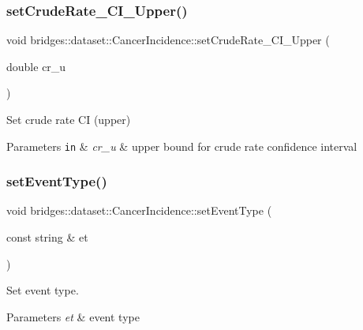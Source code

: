 \subsubsection{\texorpdfstring{set\+Crude\+Rate\+\_\+\+C\+I\+\_\+\+Upper()}{setCrudeRate\_CI\_Upper()}}
{\footnotesize\ttfamily void bridges\+::dataset\+::\+Cancer\+Incidence\+::set\+Crude\+Rate\+\_\+\+C\+I\+\_\+\+Upper (\begin{DoxyParamCaption}\item[{double}]{cr\+\_\+u }\end{DoxyParamCaption})\hspace{0.3cm}{\ttfamily [inline]}}



Set crude rate CI (upper) 


\begin{DoxyParams}[1]{Parameters}
\mbox{\tt in}  & {\em cr\+\_\+u} & upper bound for crude rate confidence interval \\
\hline
\end{DoxyParams}
\mbox{\label{classbridges_1_1dataset_1_1_cancer_incidence_aab3f76d957b69ef5fcefb491388e1d29}} 
\subsubsection{\texorpdfstring{set\+Event\+Type()}{setEventType()}}
{\footnotesize\ttfamily void bridges\+::dataset\+::\+Cancer\+Incidence\+::set\+Event\+Type (\begin{DoxyParamCaption}\item[{const string \&}]{et }\end{DoxyParamCaption})\hspace{0.3cm}{\ttfamily [inline]}}



Set event type. 


\begin{DoxyParams}{Parameters}
{\em et} & event type \\
\hline
\end{DoxyParams}
\mbox{\label{classbridges_1_1dataset_1_1_cancer_incidence_aaf7aa19ce1946af9443e1584e5998e7b}} 
